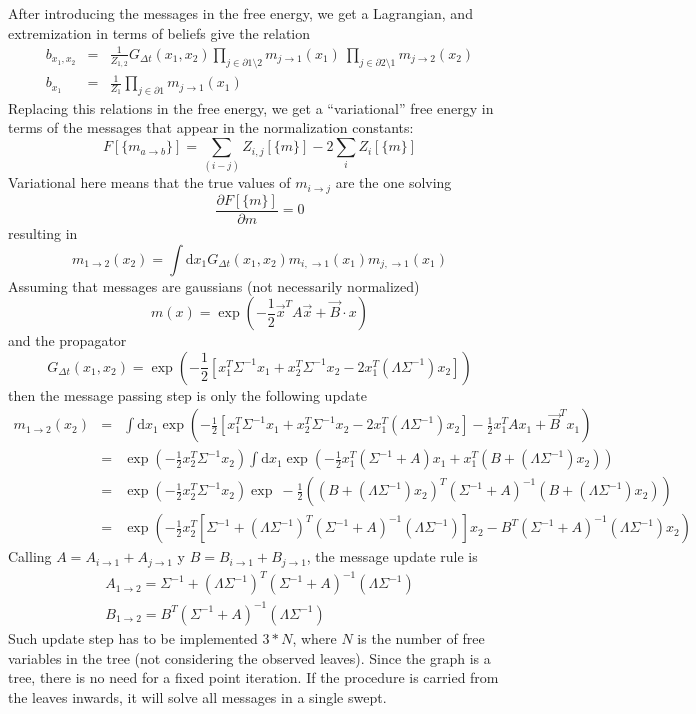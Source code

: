 \documentclass[10pt]{article}
\newcommand{\ud}{\mathrm{d}}
\begin{document}
After introducing the messages in the free energy, we get a Lagrangian, and extremization in terms of beliefs give the relation
\begin{eqnarray}
b_{x_1,x_2} &=& \frac 1 {Z_{1,2}} G_{\Delta t}(x_1,x_2) \prod_{j\in \partial 1\setminus 2} m_{j\to 1}(x_1)  \:\prod_{j\in \partial 2\setminus 1} m_{j\to 2}(x_2) \\
b_{x_1} &=&  \frac 1 {Z_{1}}  \prod_{j\in \partial 1} m_{j\to 1}(x_1)  
\end{eqnarray}
Replacing this relations in the free energy, we get a ``variational'' free energy in terms of the messages that appear in the normalization constants:
\[ F[\{m_{a\to b} \}] = \sum_{(i-j)} Z_{i,j}[\{m\}] - 2 \sum_{i} Z_i[\{m\}] \]
Variational here means that the true values of $m_{i\to j}$ are the one solving 
\[\frac{\partial F[\{m\}]}{\partial m} = 0\]
resulting in 
\[ m_{1\to 2}(x_2) = \int \ud x_1 G_{\Delta t}(x_1,x_2) m_{i,\to 1}(x_1) m_{j,\to 1}(x_1)  \]
Assuming that messages are gaussians (not necessarily normalized)
\[ m(x) = \exp\left( -\frac 1 2 \vec x^T A \vec x + \vec B\cdot x\right)\]
and the propagator
\[G_{\Delta t} (x_1,x_2) = \exp\left( -\frac 1 2 [ x_1^T \Sigma^{-1} x_1 + x_2^T \Sigma^{-1} x_2 - 2 x_1^T (\Lambda \Sigma^{-1}) x_2 ] 
\right)\]
then the message passing step is only the following update
\begin{eqnarray*}
 m_{1\to 2}(x_2) &=& \int \ud x_1  \exp\left( -\frac 1 2 [ x_1^T \Sigma^{-1} x_1 + x_2^T \Sigma^{-1} x_2 - 2 x_1^T (\Lambda \Sigma^{-1}) x_2 ] 
-\frac 1 2 x_1^T A x_1 + \vec B^T x_1\right)  \\
&=& \exp\left( -\frac 1 2  x_2^T \Sigma^{-1} x_2 \right) \int \ud x_1  \exp\left( -\frac 1 2 x_1^T (\Sigma^{-1} + A) x_1 + x_1^T (B + (\Lambda \Sigma^{-1}) x_2) \right)  \\
&=&\exp\left( -\frac 1 2  x_2^T \Sigma^{-1} x_2 \right)  \exp\ -\frac 1 2 \left(  (B + (\Lambda \Sigma^{-1})x_2)^T (\Sigma^{-1} + A)^{-1}  (B + (\Lambda \Sigma^{-1}) x_2) \right) \\
&=&\exp\left( -\frac 1 2  x_2^T \left[ \Sigma^{-1} +(\Lambda \Sigma^{-1})^T (\Sigma^{-1} + A)^{-1}(\Lambda \Sigma^{-1}) \right] x_2   -B^T  (\Sigma^{-1} + A)^{-1}   (\Lambda \Sigma^{-1}) x_2 \right) 
\end{eqnarray*}
Calling $A = A_{i\to 1} + A_{j\to 1}$ y  $B = B_{i\to 1} + B_{j\to 1}$, the message update rule is
\begin{eqnarray*}
 A_{1\to 2} =  \Sigma^{-1} +(\Lambda \Sigma^{-1})^T (\Sigma^{-1} + A)^{-1}(\Lambda \Sigma^{-1})  \\
 B_{1 \to 2} = B^T  (\Sigma^{-1} + A)^{-1}   (\Lambda \Sigma^{-1}) 
\end{eqnarray*}
Such update step has to be implemented $3*N$, where $N$ is the number of free variables in the tree (not considering the observed leaves). Since the graph is a tree, there is no need for a fixed point iteration. If the procedure is carried from the leaves inwards, it will solve all messages in a single swept.
\end{document}
